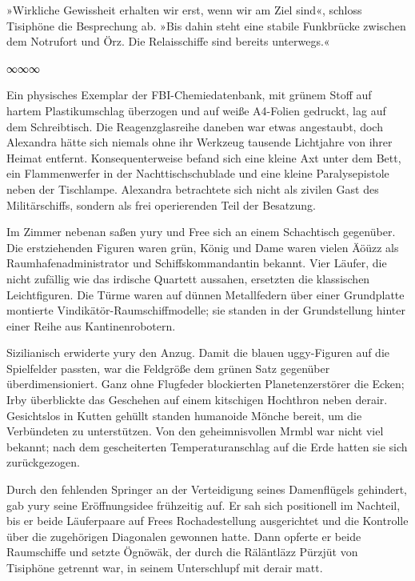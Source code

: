 »Wirkliche Gewissheit erhalten wir erst, wenn wir am Ziel sind«, schloss Tisiphöne die Besprechung ab. »Bis dahin steht eine stabile Funkbrücke zwischen dem Notrufort und Örz. Die Relaisschiffe sind bereits unterwegs.«

\begin{center}
∞∞∞
\end{center}

Ein physisches Exemplar der FBI-Chemiedatenbank, mit grünem Stoff auf hartem Plastikumschlag überzogen und auf weiße A4-Folien gedruckt, lag auf dem Schreibtisch. Die Reagenzglasreihe daneben war etwas angestaubt, doch Alexandra hätte sich niemals ohne ihr Werkzeug tausende Lichtjahre von ihrer Heimat entfernt. Konsequenterweise befand sich eine kleine Axt unter dem Bett, ein Flammenwerfer in der Nachttischschublade und eine kleine Paralysepistole neben der Tischlampe. Alexandra betrachtete sich nicht als zivilen Gast des Militärschiffs, sondern als frei operierenden Teil der Besatzung.

Im Zimmer nebenan saßen yury und Free sich an einem Schachtisch gegenüber. Die erstziehenden Figuren waren grün, König und Dame waren vielen Äöüzz als Raumhafenadministrator und Schiffskommandantin bekannt. Vier Läufer, die nicht zufällig wie das irdische Quartett aussahen, ersetzten die klassischen Leichtfiguren. Die Türme waren auf dünnen Metallfedern über einer Grundplatte montierte Vindikätör-Raumschiffmodelle; sie standen in der Grundstellung hinter einer Reihe aus Kantinenrobotern.

Sizilianisch erwiderte yury den Anzug. Damit die blauen uggy-Figuren auf die Spielfelder passten, war die Feldgröße dem grünen Satz gegenüber überdimensioniert. Ganz ohne Flugfeder blockierten Planetenzerstörer die Ecken; Irby überblickte das Geschehen auf einem kitschigen Hochthron neben derair. Gesichtslos in Kutten gehüllt standen humanoide Mönche bereit, um die Verbündeten zu unterstützen. Von den geheimnisvollen Mrmbl war nicht viel bekannt; nach dem gescheiterten Temperaturanschlag auf die Erde hatten sie sich zurückgezogen.

Durch den fehlenden Springer an der Verteidigung seines Damenflügels gehindert, gab yury seine Eröffnungsidee frühzeitig auf. Er sah sich positionell im Nachteil, bis er beide Läuferpaare auf Frees Rochadestellung ausgerichtet und die Kontrolle über die zugehörigen Diagonalen gewonnen hatte. Dann opferte er beide Raumschiffe und setzte Ögnöwäk, der durch die Räläntläzz Pürzjüt von Tisiphöne getrennt war, in seinem Unterschlupf mit derair matt.

